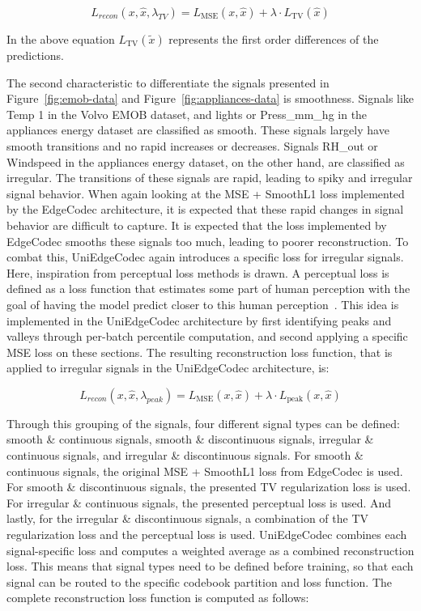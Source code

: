 \begin{equation}
L_{recon}(x, \hat{x}, \lambda_{TV}) = L_\mathrm{MSE}(x, \hat{x}) + \lambda \cdot L_\mathrm{TV}(\hat{x})
\end{equation}

In the above equation $L_\mathrm{TV}(\tilde{x})$ represents the first order differences of the predictions. 

The second characteristic to differentiate the signals presented in Figure~\ref{fig:emob-data} and Figure~\ref{fig:appliances-data} is smoothness. Signals like Temp 1 in the Volvo EMOB dataset, and lights or Press\_mm\_hg in the appliances energy dataset are classified as smooth. These signals largely have smooth transitions and no rapid increases or decreases. Signals RH\_out or Windspeed in the appliances energy dataset, on the other hand, are classified as irregular. The transitions of these signals are rapid, leading to spiky and irregular signal behavior. When again looking at the MSE + SmoothL1 loss implemented by the EdgeCodec architecture, it is expected that these rapid changes in signal behavior are difficult to capture. It is expected that the loss implemented by EdgeCodec smooths these signals too much, leading to poorer reconstruction. To combat this, UniEdgeCodec again introduces a specific loss for irregular signals. Here, inspiration from perceptual loss methods is drawn. A perceptual loss is defined as a loss function that estimates some part of human perception with the goal of having the model predict closer to this human perception~\cite{Pihlgren2024}. This idea is implemented in the UniEdgeCodec architecture by first identifying peaks and valleys through per-batch percentile computation, and second applying a specific MSE loss on these sections. The resulting reconstruction loss function, that is applied to irregular signals in the UniEdgeCodec architecture, is: 

\begin{equation}
L_{recon}(x, \hat{x}, \lambda_{peak}) = L_\mathrm{MSE}(x, \hat{x}) + \lambda \cdot L_\mathrm{peak}(x, \hat{x})
\end{equation}

Through this grouping of the signals, four different signal types can be defined: smooth \& continuous signals, smooth \& discontinuous signals, irregular \& continuous signals, and irregular \& discontinuous signals. For smooth \& continuous signals, the original MSE + SmoothL1 loss from EdgeCodec is used. For smooth \& discontinuous signals, the presented TV regularization loss is used. For irregular \& continuous signals, the presented perceptual loss is used. And lastly, for the irregular \& discontinuous signals, a combination of the TV regularization loss and the perceptual loss is used. UniEdgeCodec combines each signal-specific loss and computes a weighted average as a combined reconstruction loss. This means that signal types need to be defined before training, so that each signal can be routed to the specific codebook partition and loss function. The complete reconstruction loss function is computed as follows: 

